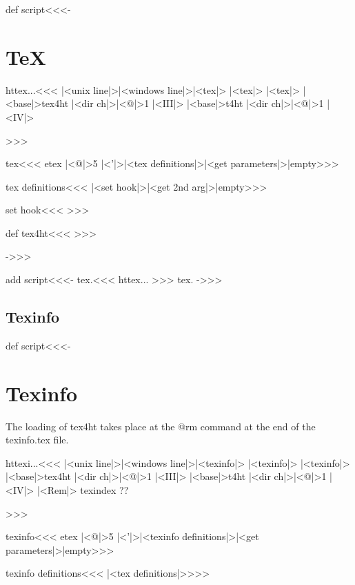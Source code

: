 \documentclass{article}
\begin{document}
\<def script\><<<-

\section{TeX}


\<httex...\><<<
|<unix line|>|<windows line|>|<tex|>
        |<tex|>
        |<tex|>
        |<base|>tex4ht |<dir ch|>|<@|>1 |<III|>
        |<base|>t4ht |<dir ch|>|<@|>1 |<IV|>

>>>

\<tex\><<<
etex  |<@|>5 |<'|>|<tex definitions|>|<get parameters|>|empty>>>


\<tex definitions\><<<
|<set hook|>|<get 2nd arg|>|empty>>>

\<set hook\><<<
\def\Link#1.a.b.c.{|<def tex4ht|>{|<options|> }}>>>


\<def tex4ht\><<<
\expandafter\def\csname tex4ht\endcsname>>>

->>>


\<add script\><<<-
\<\pref tex.\ext\><<<
\<httex...\>
>>> %
%
\OutputCodE\<\pref tex.\ext\>      %
%
->>>

\subsection{Texinfo}


\<def script\><<<-
\section{Texinfo}

The loading of tex4ht takes place at the @rm command at the end of the
texinfo.tex file.

\<httexi...\><<<
|<unix line|>|<windows line|>|<texinfo|>
        |<texinfo|>
        |<texinfo|>
        |<base|>tex4ht |<dir ch|>|<@|>1 |<III|>
        |<base|>t4ht |<dir ch|>|<@|>1 |<IV|>
|<Rem|>        texindex ??

>>>

\<texinfo\><<<
etex |<@|>5 |<'|>|<texinfo definitions|>|<get parameters|>|empty>>>


\<texinfo definitions\><<<
|<tex definitions|>\let\svrm=\rm\def\rm{\svrm|<tex4ht into texinfo|>}>>>
\end{document}
